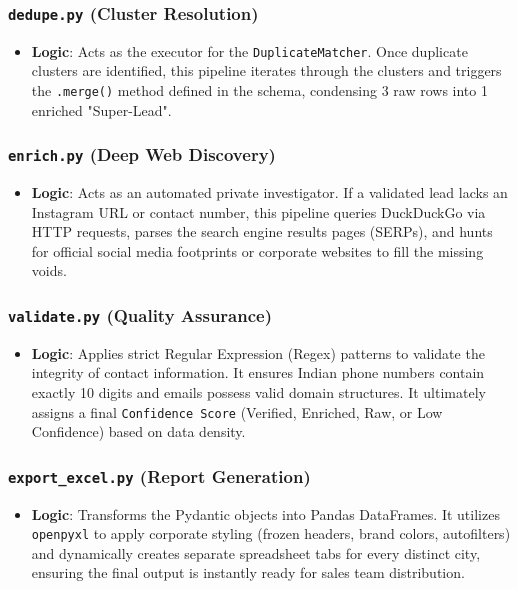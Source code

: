 \documentclass[12pt,a4paper]{article}
\begin{document}
\subsubsection{\texttt{dedupe.py} (Cluster Resolution)}
\begin{itemize}
    \item \textbf{Logic}: Acts as the executor for the \texttt{DuplicateMatcher}. Once duplicate clusters are identified, this pipeline iterates through the clusters and triggers the \texttt{.merge()} method defined in the schema, condensing 3 raw rows into 1 enriched "Super-Lead".
\end{itemize}

\subsubsection{\texttt{enrich.py} (Deep Web Discovery)}
\begin{itemize}
    \item \textbf{Logic}: Acts as an automated private investigator. If a validated lead lacks an Instagram URL or contact number, this pipeline queries DuckDuckGo via HTTP requests, parses the search engine results pages (SERPs), and hunts for official social media footprints or corporate websites to fill the missing voids.
\end{itemize}

\subsubsection{\texttt{validate.py} (Quality Assurance)}
\begin{itemize}
    \item \textbf{Logic}: Applies strict Regular Expression (Regex) patterns to validate the integrity of contact information. It ensures Indian phone numbers contain exactly 10 digits and emails possess valid domain structures. It ultimately assigns a final \texttt{Confidence Score} (Verified, Enriched, Raw, or Low Confidence) based on data density.
\end{itemize}

\subsubsection{\texttt{export\_excel.py} (Report Generation)}
\begin{itemize}
    \item \textbf{Logic}: Transforms the Pydantic objects into Pandas DataFrames. It utilizes \texttt{openpyxl} to apply corporate styling (frozen headers, brand colors, autofilters) and dynamically creates separate spreadsheet tabs for every distinct city, ensuring the final output is instantly ready for sales team distribution.
\end{itemize}
\end{document}
